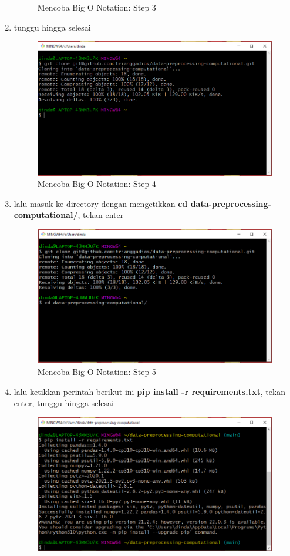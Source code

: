\begin{enumerate}
\begin{figure}[H]
        \caption{Mencoba Big O Notation: Step 3}
\end{figure}
\item tunggu hingga selesai
\begin{figure}[H]
        \centerline{\includegraphics[scale=0.35]{figures/mencoba-computational/step4}}
        \caption{Mencoba Big O Notation: Step 4}
\end{figure}
\item lalu masuk ke directory dengan mengetikkan \textbf{cd data-preprocessing-computational/}, tekan enter
\begin{figure}[H]
        \centerline{\includegraphics[scale=0.35]{figures/mencoba-computational/step5}}
        \caption{Mencoba Big O Notation: Step 5}
\end{figure}
\item lalu ketikkan perintah berikut ini \textbf{pip install -r requirements.txt}, tekan enter, tunggu hingga selesai
\begin{figure}[H]
        \centerline{\includegraphics[scale=0.35]{figures/mencoba-computational/step6}}

\end{figure}
\end{enumerate}
